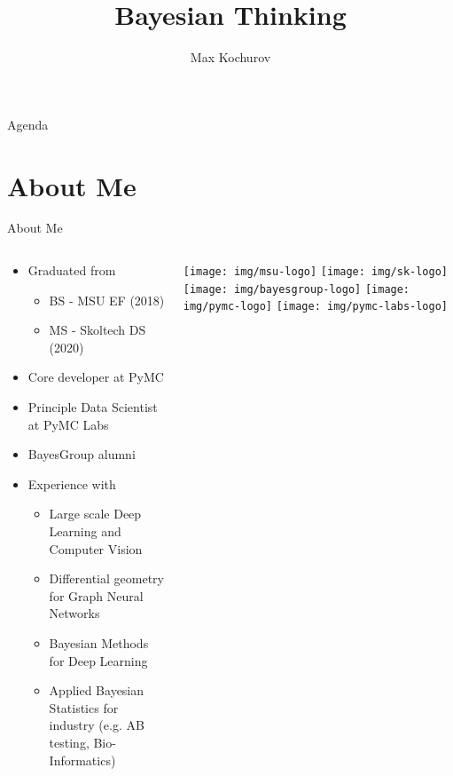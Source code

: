 \documentclass{beamer}
\author{Max Kochurov}
\title[Practical Bayes - Bayesian Thinking]{Bayesian Thinking}
\institute[MSU]{Moscow State University}
\begin{document}

\begin{frame}
	\maketitle
\end{frame}

\begin{frame}{Agenda}
\tableofcontents
\end{frame}
\nologo
\section{About Me}
\begin{frame}{About Me}
\begin{columns}
\begin{column}{0.75\linewidth}
\begin{itemize}
    \item Graduated from 
        \begin{itemize}
            \item BS - MSU EF (2018)
            \item MS - Skoltech DS (2020)
        \end{itemize}
    \item Core developer at PyMC
    \item Principle Data Scientist at PyMC Labs
    \item BayesGroup alumni
    \item Experience with 
    \begin{itemize}
        \item Large scale Deep Learning and Computer Vision
        \item Differential geometry for Graph Neural Networks
        \item Bayesian Methods for Deep Learning
        \item Applied Bayesian Statistics for industry (e.g. AB testing, Bio-Informatics)
    \end{itemize}
\end{itemize}
\end{column}
\begin{column}{0.25\linewidth}
\texttt{[image: img/msu-logo]}
\texttt{[image: img/sk-logo]}
\texttt{[image: img/bayesgroup-logo]}
\texttt{[image: img/pymc-logo]}
\texttt{[image: img/pymc-labs-logo]}
\end{column}
\end{columns}
\end{frame}
\end{document}
